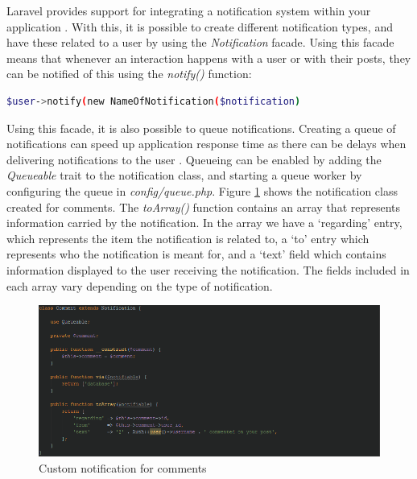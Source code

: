 Laravel provides support for integrating a notification system within your application \cite{Laravel:Notifications}. With this, it is possible to create different notification types, and have these related to a user by using the \textit{Notification} facade. Using this facade means that whenever an interaction happens with a user or with their posts, they can be notified of this using the \textit{notify()} function:

\begin{lstlisting}[language=bash]
	$user->notify(new NameOfNotification($notification)
\end{lstlisting}

Using this facade, it is also possible to queue notifications. Creating a queue of notifications can speed up application response time as there can be delays when delivering notifications to the user \cite{Laravel:Notifications, Laravel:Queues}. Queueing can be enabled by adding the \textit{Queueable} trait to the notification class, and starting a queue worker by configuring the queue in \textit{config/queue.php}. Figure \ref{fig:CommentNotification} shows the notification class created for comments. The \textit{toArray()} function contains an array that represents information carried by the notification. In the array we have a `regarding' entry, which represents the item the notification is related to, a `to' entry which represents who the notification is meant for, and a `text' field which contains information displayed to the user receiving the notification. The fields included in each array vary depending on the type of notification.

\begin{figure}[H]
\centering
\includegraphics[width=\textwidth]{Images/Implementation/CommentNotification}
\caption{Custom notification for comments}
\label{fig:CommentNotification}
\end{figure}

